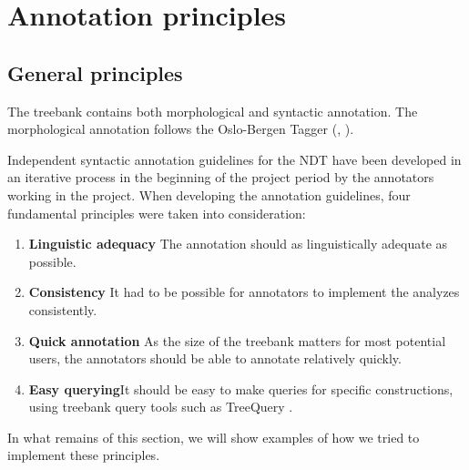 \documentclass[11pt,a4paper]{article}
\begin{document}

\section{Annotation principles}
\subsection{General principles}


The treebank contains both morphological and syntactic annotation. The morphological annotation follows the Oslo-Bergen Tagger (\cite{Hag:Joh:Nok:00}, \cite<see also>{Sol:2013}).

Independent syntactic annotation guidelines for the NDT have been developed in an iterative process in the beginning of the project period by the annotators working in the project\cite{Kin:Sol:Eri:2013}. When developing the annotation guidelines, four fundamental principles were taken into consideration:
\begin{enumerate}
 \item \textbf{Linguistic adequacy} The annotation should as linguistically adequate as possible.
 \item \textbf{Consistency} It had to be possible for annotators to implement the analyzes consistently.
 \item \textbf{Quick annotation} As the size of the treebank matters for most potential users, the annotators should be able to annotate relatively quickly.
 \item \textbf{Easy querying}It should be easy to make queries for specific constructions, using treebank query tools such as TreeQuery \cite{Paj:Ste:09}.
\end{enumerate}
In what remains of this section, we will show examples of how we tried to implement these principles.
\end{document}
